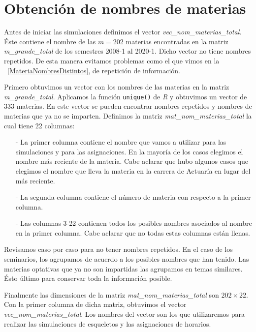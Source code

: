 \section{Obtención de nombres de materias} \label{Sec_NomMaterias}

Antes de iniciar las simulaciones definimos el vector \textit{vec\_nom\_materias\_total}. Éste contiene el nombre de las $m = 202$ materias encontradas en la matriz \textit{m\_grande\_total} de los semestres 2008-1 al 2020-1. Dicho vector  no tiene nombres repetidos. De esta manera evitamos problemas como el que vimos en la \figurename{~\ref{MateriaNombresDistintos}}, de repetición de información.

Primero obtuvimos un vector con los nombres de las materias en la matriz \textit{m\_grande\_total}. Aplicamos la función \verb+unique()+ de \textit{R} y obtuvimos un vector de 333 materias. En este vector se pueden encontrar nombres repetidos y nombres de materias que ya no se imparten. Definimos la matriz \textit{mat\_nom\_materias\_total} la cual tiene 22 columnas:

\begin{itemize}
\item[-] La primer columna contiene el nombre que vamos a utilizar para las simulaciones y para las asignaciones. En la mayoría de los casos elegimos el nombre más reciente de la materia. Cabe aclarar que hubo algunos casos que elegimos el nombre que lleva la materia en la carrera de Actuaría en lugar del más reciente.

\item[-] La segunda columna contiene el número de materia con respecto a la primer columna.

\item[-] Las columnas 3-22 contienen todos los posibles nombres asociados al nombre en la primer columna. Cabe aclarar que no todas estas columnas están llenas.
\end{itemize}

Revisamos caso por caso para no tener nombres repetidos. En el caso de los seminarios, los agrupamos de acuerdo a los posibles nombres que han tenido. Las materias optativas que ya no son impartidas las agrupamos en temas similares. Ésto último para conservar toda la información posible. %

Finalmente las dimensiones de la matriz \textit{mat\_nom\_materias\_total} son $202 \times 22$. Con la primer columna de dicha matriz, obtuvimos el vector \textit{vec\_nom\_materias\_total}. Los nombres del vector son los que utilizaremos para realizar las simulaciones de esqueletos y las asignaciones de horarios.
